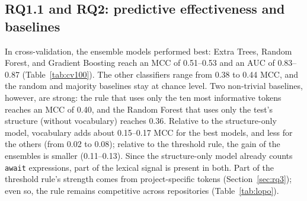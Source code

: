 \subsection{RQ1.1 and RQ2: predictive effectiveness and baselines}
\label{sec:rq1}
In cross-validation, the ensemble models performed best: Extra Trees, Random Forest, and Gradient Boosting reach an MCC of 0.51--0.53 and an AUC of 0.83--0.87 (Table~\ref{tab:cv100}). The other classifiers range from 0.38 to 0.44 MCC, and the random and majority baselines stay at chance level. Two non-trivial baselines, however, are strong: the rule that uses only the ten most informative tokens reaches an MCC of 0.40, and the Random Forest that uses only the test's structure (without vocabulary) reaches 0.36. Relative to the structure-only model, vocabulary adds about 0.15--0.17 MCC for the best models, and less for the others (from 0.02 to 0.08); relative to the threshold rule, the gain of the ensembles is smaller (0.11--0.13). Since the structure-only model already counts \texttt{await} expressions, part of the lexical signal is present in both.  Part of the threshold rule's strength comes from project-specific tokens (Section~\ref{sec:rq3}); even so, the rule remains competitive across repositories (Table~\ref{tab:lopo}).

